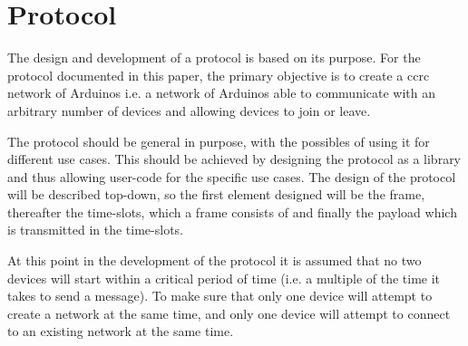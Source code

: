 \section{Protocol}
The design and development of a protocol is based on its purpose.
For the protocol documented in this paper, the primary objective is to create a \acrlong{ccrc} network of Arduinos i.e. a network of Arduinos able to communicate with an arbitrary number of devices and allowing devices to join or leave. 

The protocol should be general in purpose, with the possibles of using it for different use cases.
This should be achieved by designing the protocol as a library and thus allowing user-code for the specific use cases.
The design of the protocol will be described top-down, so the first element designed will be the frame, thereafter the time-slots, which a frame consists of and finally the payload which is transmitted in the time-slots. 

At this point in the development of the protocol it is assumed that no two devices will start within a critical period of time (i.e. a multiple of the time it takes to send a message).
To make sure that only one device will attempt to create a network at the same time, and only one device will attempt to connect to an existing network at the same time. 
